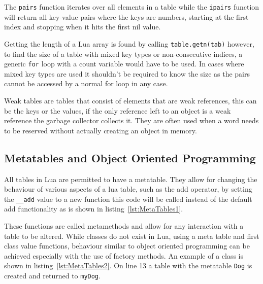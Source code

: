 \documentclass[11pt,a4paper,titlepage]{report}
\begin{document}
	\singlespacing
	
	\onehalfspacing


	The \texttt{pairs} function iterates over all elements in a table while the \texttt{ipairs} function will return all key-value pairs where the keys are numbers, starting at the first index and stopping when it hits the first nil value.~\cite{Ierusalimschy:2013:PLT:2502646} 
	
	Getting the length of a Lua array is found by calling \texttt{table.getn(tab)} however, to find the size of a table with mixed key types or non-consecutive indices, a generic \texttt{for} loop with a count variable would have to be used. In cases where mixed key types are used it shouldn't be required to know the size as the pairs cannot be accessed by a normal for loop in any case.

	Weak tables are tables that consist of elements that are weak references, this can be the keys or the values, if the only reference left to an object is a weak reference the garbage collector collects it. They are often used when a word needs to be reserved without actually creating an object in memory.
	
\subsection{Metatables and Object Oriented Programming}
	All tables in Lua are permitted to have a metatable\cite{Ierusalimschy:2013:PLT:2502646}. They allow for changing the behaviour of various aspects of a lua table, such as the add operator, by setting the \texttt{\_\_add} value to a new function this code will be called instead of the default add functionality as is shown in listing~\ref{lst:MetaTables1}.

	\singlespacing
	
	\onehalfspacing


	These functions are called metamethods and allow for any interaction with a table to be altered. While classes do not exist in Lua, using a meta table and first class value functions, behaviour similar to object oriented programming can be achieved especially with the use of factory methods. An example of a class is shown in listing~\ref{lst:MetaTables2}. On line 13 a table with the metatable \texttt{Dog} is created and returned to \texttt{myDog}.
\end{document}
